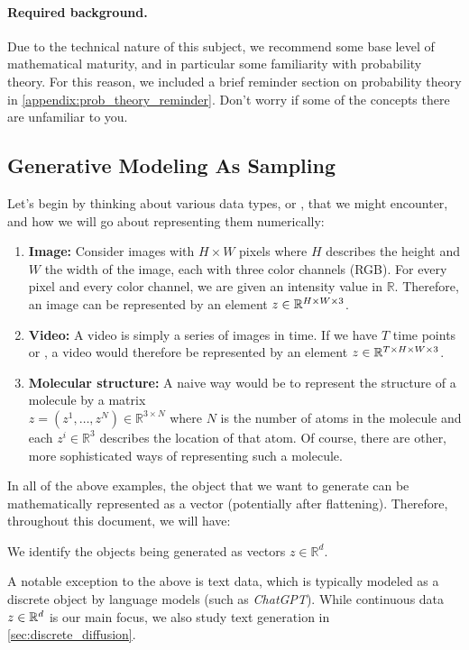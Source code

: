 \paragraph{Required background.} Due to the technical nature of this subject, we recommend some base level of mathematical maturity, and in particular some familiarity with probability theory. For this reason, we included a brief reminder section on probability theory in \cref{appendix:prob_theory_reminder}. Don't worry if some of the concepts there are unfamiliar to you.

\subsection{Generative Modeling As Sampling}
\label{subsec:gm_as_sampling}
Let's begin by thinking about various data types, or , that we might encounter, and how we will go about representing them numerically:
\begin{enumerate}
    \item \textbf{\sffamily Image: }Consider images with $H \times W$ pixels where $H$ describes the height and $W$ the width of the image, each with three color channels (RGB). For every pixel and every color channel, we are given an intensity value in $\mathbb{R}$. Therefore, an image can be represented by an element $z\in\mathbb{R}^{H \times W \times 3}$.
    \item \textbf{\sffamily Video: }A video is simply a series of images in time. If we have $T$ time points or , a video would therefore be represented by an element $z\in\mathbb{R}^{T\times H \times W \times 3}$.
    \item \textbf{\sffamily Molecular structure: }A naive way would be to represent the structure of a molecule by a matrix \\$z=(z^1,\dots,z^N)\in\mathbb{R}^{3\times N}$ where $N$ is the number of atoms in the molecule and each $z^i\in\mathbb{R}^3$ describes the location of that atom. Of course, there are other, more sophisticated ways of representing such a molecule.
\end{enumerate}
In all of the above examples, the object that we want to generate can be mathematically represented as a vector (potentially after flattening). Therefore, throughout this document, we will have:
\begin{ideabox}
    We identify the objects being generated as vectors $z \in \mathbb{R}^d$.
\end{ideabox}
A notable exception to the above is text data, which is typically modeled as a discrete object by language models (such as \emph{ChatGPT}). While continuous data $z\in \mathbb{R}^d$ is our main focus, we also study text generation in \cref{sec:discrete_diffusion}.

